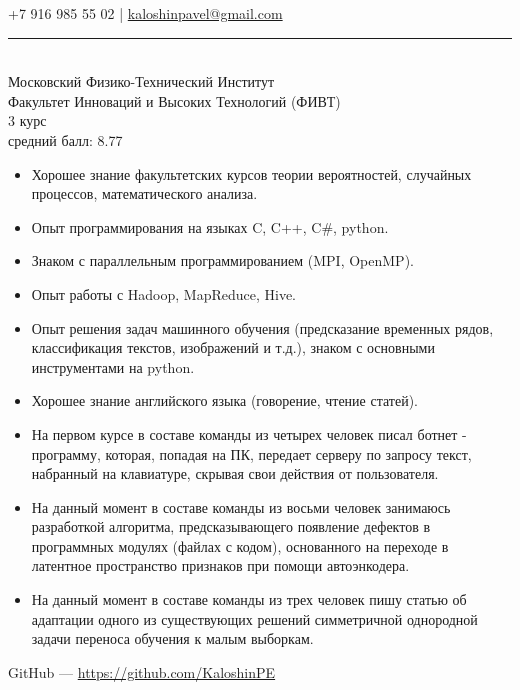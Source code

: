 \documentclass[11pt]{article}
\begin{document}
 
%

\vspace{0.5em}
 
\noindent +7 916 985 55 02    |   \href{mailto:kaloshinpavel@gmail.com}{kaloshinpavel@gmail.com}
 
\vspace{0.5em}
 
\hrule
 
\vspace{1.5em}

	\vspace{0.5em}
	\\ Московский Физико-Технический Институт
	\\ Факультет Инноваций и Высоких Технологий (ФИВТ)
	\\ 3 курс
	\\ средний балл: 8.77

\vspace{2em}
 
\begin{itemize}
\item Хорошее знание факультетских курсов теории вероятностей, случайных процессов, математического анализа.
\item Опыт программирования на языках C, C++, C\#, python.
\item Знаком с параллельным программированием (MPI, OpenMP).
\item Опыт работы с Hadoop, MapReduce, Hive.
\item Опыт решения задач машинного обучения (предсказание временных рядов, классификация текстов, изображений и т.д.), знаком с основными инструментами на python.
\item Хорошее знание английского языка (говорение, чтение статей).
\end{itemize}
\vspace{1em}

\begin{itemize}
\item На первом курсе в составе команды из четырех человек писал ботнет - программу, которая, попадая на ПК, передает серверу по запросу текст, набранный на клавиатуре, скрывая свои действия от пользователя.
\item На данный момент в составе команды из восьми человек занимаюсь разработкой алгоритма, предсказывающего появление дефектов в программных модулях (файлах с кодом), основанного на переходе в латентное пространство признаков при помощи автоэнкодера. 
\item На данный момент в составе команды из трех человек пишу статью об адаптации одного из существующих решений симметричной однородной задачи переноса обучения к малым выборкам.
\end{itemize}
\vspace{1em}
 
\noindent GitHub — \href{https://github.com/KaloshinPE}{https://github.com/KaloshinPE}
\end{document}
